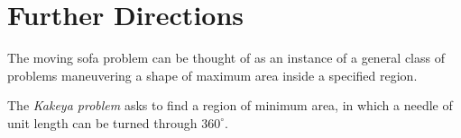 \section{Further Directions}

The moving sofa problem can be thought of as an instance of a general class of problems  maneuvering a shape of maximum area inside a specified region.


The \emph{Kakeya problem} asks to find a region of minimum area, in which a needle of unit length can be turned through $360^\circ$.
